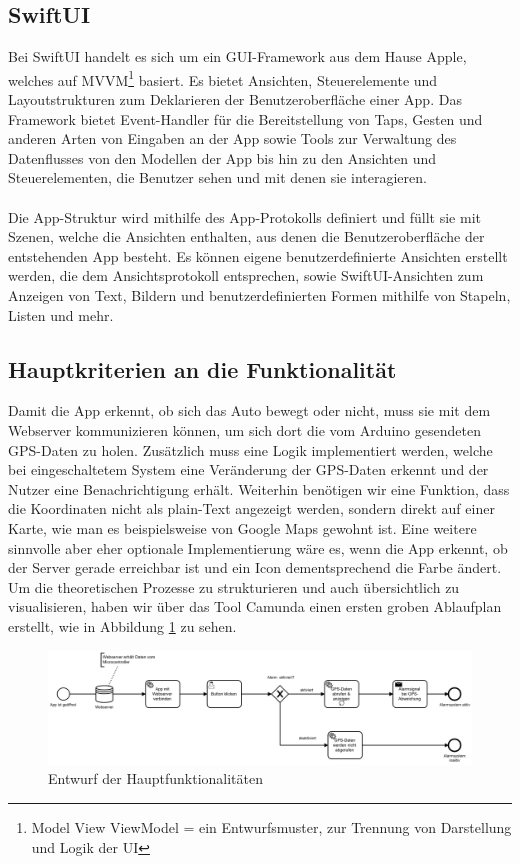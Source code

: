 \subsection{SwiftUI}
Bei SwiftUI handelt es sich um ein GUI-Framework aus dem Hause Apple, welches auf MVVM\footnote{Model View ViewModel = ein Entwurfsmuster, zur Trennung von Darstellung und Logik der UI} basiert.
Es bietet Ansichten, Steuerelemente und Layoutstrukturen zum Deklarieren der Benutzeroberfläche einer App. Das Framework bietet Event-Handler für die Bereitstellung von Taps, Gesten und anderen Arten von Eingaben an der App sowie Tools zur Verwaltung des Datenflusses von den Modellen der App bis hin zu den Ansichten und Steuerelementen, die Benutzer sehen und mit denen sie interagieren.\cite{Inca}
\\
\\
Die App-Struktur wird mithilfe des App-Protokolls definiert und füllt sie mit Szenen, welche die Ansichten enthalten, aus denen die Benutzeroberfläche der entstehenden App besteht. Es können eigene benutzerdefinierte Ansichten erstellt werden, die dem Ansichtsprotokoll entsprechen, sowie  SwiftUI-Ansichten zum Anzeigen von Text, Bildern und benutzerdefinierten Formen mithilfe von Stapeln, Listen und mehr. \cite{Inca}

\subsection{Hauptkriterien an die Funktionalität}

Damit die App erkennt, ob sich das Auto bewegt oder nicht, muss sie mit dem Webserver kommunizieren können, um sich dort die vom Arduino gesendeten GPS-Daten zu holen. Zusätzlich muss eine Logik implementiert werden, welche bei eingeschaltetem System eine Veränderung der GPS-Daten erkennt und der Nutzer eine Benachrichtigung erhält. Weiterhin benötigen wir eine Funktion, dass die Koordinaten  nicht als plain-Text angezeigt werden, sondern direkt auf einer Karte, wie man es beispielsweise von Google Maps gewohnt ist. Eine weitere sinnvolle  aber eher optionale Implementierung wäre es, wenn die App erkennt, ob der Server gerade erreichbar ist und ein Icon dementsprechend die Farbe ändert.  Um die theoretischen Prozesse zu strukturieren und auch übersichtlich zu visualisieren, haben wir über das Tool Camunda einen ersten groben Ablaufplan erstellt, wie in Abbildung \ref{camunda} zu sehen.


\begin{figure} [H]
	\begin{center}
		\includegraphics[width=1\textwidth]{Bilder/iOS_camunda.png}
		\caption{Entwurf der Hauptfunktionalitäten}
		\label{camunda}
	\end{center}
\end{figure}


